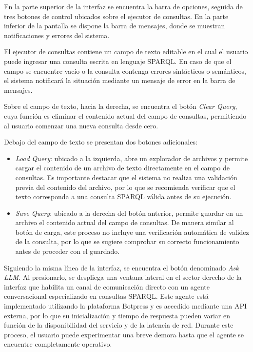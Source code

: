 \documentclass{article}
\begin{document}
En la parte superior de la interfaz se encuentra la barra de opciones, seguida de tres botones de control ubicados sobre el ejecutor de consultas. En la parte inferior de la pantalla se dispone la barra de mensajes, donde se muestran notificaciones y errores del sistema.

El ejecutor de consultas contiene un campo de texto editable en el cual el usuario puede ingresar una consulta escrita en lenguaje SPARQL. En caso de que el campo se encuentre vacío o la consulta contenga errores sintácticos o semánticos, el sistema notificará la situación mediante un mensaje de error en la barra de mensajes.

Sobre el campo de texto, hacia la derecha, se encuentra el botón \textit{Clear Query}, cuya función es eliminar el contenido actual del campo de consultas, permitiendo al usuario comenzar una nueva consulta desde cero.

Debajo del campo de texto se presentan dos botones adicionales:
\begin{itemize}
    \item \textit{Load Query}: ubicado a la izquierda, abre un explorador de archivos y permite cargar el contenido de un archivo de texto directamente en el campo de consultas. Es importante destacar que el sistema no realiza una validación previa del contenido del archivo, por lo que se recomienda verificar que el texto corresponda a una consulta SPARQL válida antes de su ejecución.
    \item \textit{Save Query}: ubicado a la derecha del botón anterior, permite guardar en un archivo el contenido actual del campo de consultas. De manera similar al botón de carga, este proceso no incluye una verificación automática de validez de la consulta, por lo que se sugiere comprobar su correcto funcionamiento antes de proceder con el guardado.
\end{itemize}

Siguiendo la misma línea de la interfaz, se encuentra el botón denominado \textit{Ask LLM}. Al presionarlo, se despliega una ventana lateral en el sector derecho de la interfaz que habilita un canal de comunicación directo con un agente conversacional especializado en consultas SPARQL. Este agente está implementado utilizando la plataforma Botpress y es accedido mediante una API externa, por lo que su inicialización y tiempo de respuesta pueden variar en función de la disponibilidad del servicio y de la latencia de red. Durante este proceso, el usuario puede experimentar una breve demora hasta que el agente se encuentre completamente operativo.
\end{document}
